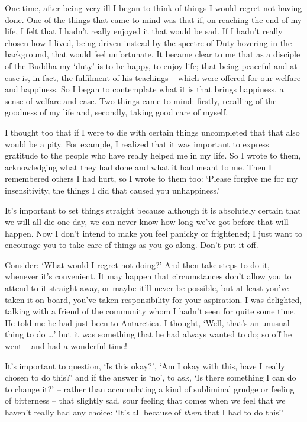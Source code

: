 

One time, after being very ill I began to think of things I would regret not having done. One of the things that came to mind was that if, on reaching the end of my life, I felt that I hadn't really enjoyed it that would be sad. If I hadn't really chosen how I lived, being driven instead by the spectre of Duty hovering in the background, that would feel unfortunate. It became clear to me that as a disciple of the Buddha my `duty' is to be happy, to enjoy life; that being peaceful and at ease is, in fact, the fulfilment of his teachings -- which were offered for our welfare and happiness. So I began to contemplate what it is that brings happiness, a sense of welfare and ease. Two things came to mind: firstly, recalling of the goodness of my life and, secondly, taking good care of myself. 

I thought too that if I were to die with certain things uncompleted that that also would be a pity. For example, I realized that it was important to express gratitude to the people who have really helped me in my life. So I wrote to them, acknowledging what they had done and what it had meant to me. Then I remembered others I had hurt, so I wrote to them too: `Please forgive me for my insensitivity, the things I did that caused you unhappiness.' 

It's important to set things straight because although it is absolutely certain that we will all die one day, we can never know how long we've got before that will happen. Now I don't intend to make you feel panicky or frightened; I just want to encourage you to take care of things as you go along. Don't put it off. 

Consider: `What would I regret not doing?' And then take steps to do it, whenever it's convenient. It may happen that circumstances don't allow you to attend to it straight away, or maybe it'll never be possible, but at least you've taken it on board, you've taken responsibility for your aspiration. I was delighted, talking with a friend of the community whom I hadn't seen for quite some time. He told me he had just been to Antarctica. I thought, `Well, that's an unusual thing to do \ldots{}\thinspace' but it was something that he had always wanted to do; so off he went -- and had a wonderful time!

It's important to question, `Is this okay?', `Am I okay with this, have I really chosen to do this?' and if the answer is `no', to ask, `Is there something I can do to change it?' -- rather than accumulating a kind of subliminal grudge or feeling of bitterness -- that slightly sad, sour feeling that comes when we feel that we haven't really had any choice: `It's all because of \textit{them} that I had to do this!'

